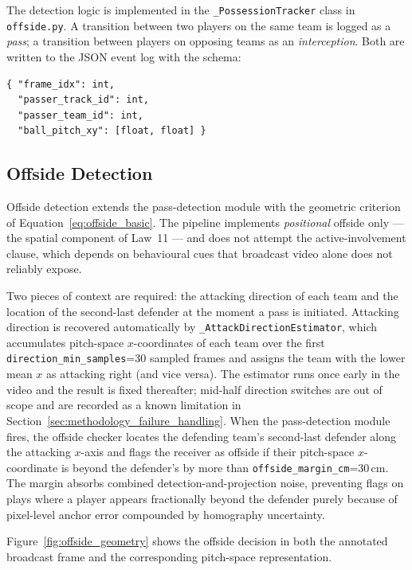 The detection logic is implemented in the \texttt{\_PossessionTracker} class
in \texttt{offside.py}. A transition between two players on the same team
is logged as a \emph{pass}; a transition between players on opposing teams
as an \emph{interception}. Both are written to the JSON event log with the
schema:

\begin{lstlisting}[basicstyle=\small\ttfamily,frame=single,framerule=0.3pt]
{ "frame_idx": int,
  "passer_track_id": int,
  "passer_team_id": int,
  "ball_pitch_xy": [float, float] }
\end{lstlisting}

\subsection{Offside Detection}
\label{subsec:methodology_offside}

Offside detection extends the pass-detection module with the geometric
criterion of Equation~\ref{eq:offside_basic}. The pipeline implements
\emph{positional} offside only --- the spatial component of Law~11 --- and
does not attempt the active-involvement clause, which depends on
behavioural cues that broadcast video alone does not reliably expose.

Two pieces of context are required: the attacking direction of each team
and the location of the second-last defender at the moment a pass is
initiated. Attacking direction is recovered automatically by
\texttt{\_AttackDirectionEstimator}, which accumulates pitch-space
$x$-coordinates of each team over the first
\texttt{direction\_min\_samples}=30 sampled frames and assigns the team with
the lower mean $x$ as attacking right (and vice versa). The estimator runs
once early in the video and the result is fixed thereafter; mid-half
direction switches are out of scope and are recorded as a known limitation
in Section~\ref{sec:methodology_failure_handling}. When the pass-detection
module fires, the offside checker locates the defending team's second-last
defender along the attacking $x$-axis and flags the receiver as offside if
their pitch-space $x$-coordinate is beyond the defender's by more than
\texttt{offside\_margin\_cm}=30\,cm. The margin absorbs combined
detection-and-projection noise, preventing flags on plays where a player
appears fractionally beyond the defender purely because of pixel-level
anchor error compounded by homography uncertainty.

Figure~\ref{fig:offside_geometry} shows the offside decision in both the
annotated broadcast frame and the corresponding pitch-space representation.

